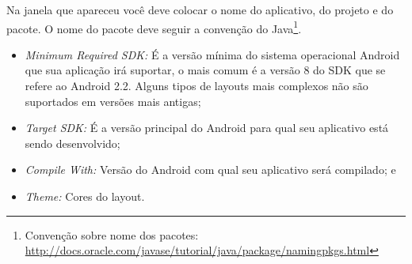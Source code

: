 \documentclass[a4paper,12pt,brazil]{book}
\begin{document}
Na janela que apareceu você deve colocar o nome do aplicativo, do projeto e do pacote. O nome do pacote deve seguir a convenção do Java\footnote{Convenção sobre nome dos pacotes: \href{http://docs.oracle.com/javase/tutorial/java/package/namingpkgs.html}{http://docs.oracle.com/javase/tutorial/java/package/namingpkgs.html}}.
\begin{itemize}[noitemsep]
	\item \textit{Minimum Required SDK:} É a versão mínima do sistema operacional Android que sua aplicação irá suportar, o mais comum é a versão 8 do SDK que se refere ao Android 2.2. Alguns tipos de layouts mais complexos não são suportados em versões mais antigas;
	\item \textit{Target SDK:} É a versão principal do Android para qual seu aplicativo está sendo desenvolvido;
	\item \textit{Compile With:} Versão do Android com qual seu aplicativo será compilado; e
	\item \textit{Theme:} Cores do layout.
\end{itemize}
\end{document}
